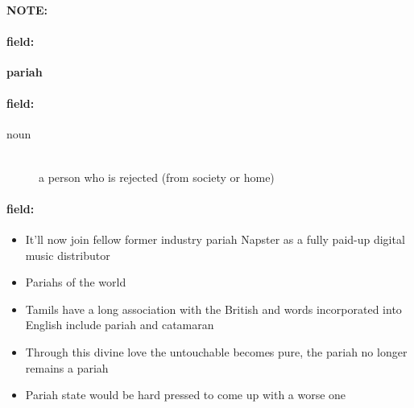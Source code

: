 \documentclass[12pt]{article}
\newenvironment{note}{\paragraph{NOTE:}}{}
\newenvironment{field}{\paragraph{field:}}{}
\begin{document}
\begin{note}
\begin{field}
\textbf{\large pariah}
\end{field}


\begin{field}
\begin{description}
\item[noun] \hfill \\ 
a person who is rejected (from society or home)

\end{description}
\end{field}

\begin{field}
\begin{itemize}
\item It'll now join fellow former industry pariah Napster as a fully paid-up digital music distributor
\item Pariahs of the world
\item Tamils have a long association with the British and words incorporated into English include pariah and catamaran
\item Through this divine love the untouchable becomes pure, the pariah no longer remains a pariah
\item Pariah state would be hard pressed to come up with a worse one
\end{itemize}
\end{field}
\end{note}
\end{document}
